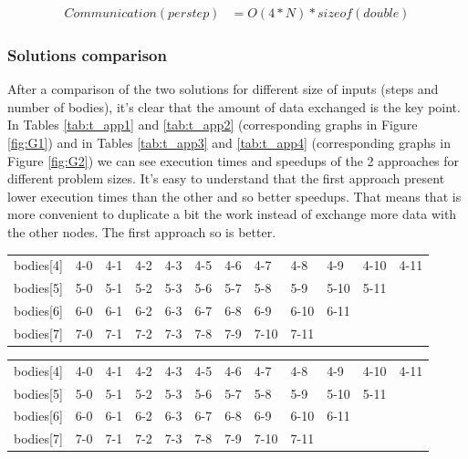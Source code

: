 \documentclass[a4paper]{article}
\begin{document}
\begin{equation} \label{eq:com_app2}
\begin{split}
Communication (per step) & = O(4*N)*sizeof(double)
\end{split}
\end{equation}


\subsubsection{Solutions comparison}
\label{sec:sol_comp}
 
After a comparison of the two solutions for different size of inputs (steps and number of bodies), it's clear that the amount of data exchanged is the key point. In Tables \ref{tab:t_app1} and \ref{tab:t_app2} (corresponding graphs in Figure \ref{fig:G1}) and in Tables \ref{tab:t_app3} and \ref{tab:t_app4} (corresponding graphs in Figure \ref{fig:G2}) we can see execution times and speedups of the 2 approaches for different problem sizes. It's easy to understand that the first approach present lower execution times than the other and so better speedups. That means that is more convenient to duplicate a bit the work instead of exchange more data with the other nodes. The first approach so is better.
\\


\begin{minipage}[b]{.40\textwidth}
  \centering
  \begin{tabular}{llllllllllll}
bodies{[}4{]} & 4-0 & 4-1 & 4-2 & 4-3 & 4-5 & 4-6 & 4-7  & 4-8  & 4-9  & 4-10 & 4-11 \\
bodies{[}5{]} & 5-0 & 5-1 & 5-2 & 5-3 & 5-6 & 5-7 & 5-8  & 5-9  & 5-10 & 5-11 &      \\
bodies{[}6{]} & 6-0 & 6-1 & 6-2 & 6-3 & 6-7 & 6-8 & 6-9  & 6-10 & 6-11 &      &      \\
bodies{[}7{]} & 7-0 & 7-1 & 7-2 & 7-3 & 7-8 & 7-9 & 7-10 & 7-11 &      &      &     
\end{tabular}
  \label{tab:t_app1}
\end{minipage} \qquad
\begin{minipage}[b]{.40\textwidth}
  \centering
\begin{tabular}{llllllllllll}
bodies{[}4{]} & 4-0 & 4-1 & 4-2 & 4-3 & 4-5 & 4-6 & 4-7  & 4-8  & 4-9  & 4-10 & 4-11 \\
bodies{[}5{]} & 5-0 & 5-1 & 5-2 & 5-3 & 5-6 & 5-7 & 5-8  & 5-9  & 5-10 & 5-11 &      \\
bodies{[}6{]} & 6-0 & 6-1 & 6-2 & 6-3 & 6-7 & 6-8 & 6-9  & 6-10 & 6-11 &      &      \\
bodies{[}7{]} & 7-0 & 7-1 & 7-2 & 7-3 & 7-8 & 7-9 & 7-10 & 7-11 &      &      &     
\end{tabular}
  \label{tab:t_app2}
\end{minipage}
\end{document}
